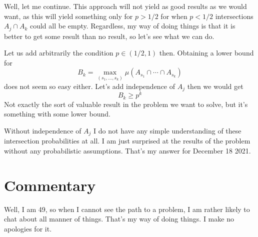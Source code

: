 \documentclass{amsart}
\begin{document}
Well, let me continue.  This approach will not yield as good results as we would want, as this will yield something only for $p>1/2$ for when $p<1/2$ intersections $A_j \cap A_k$ could all be empty.  Regardless, my way of doing things is that it is better to get some result than no result, so let's see what we can do.

Let us add arbitrarily the condition $p\in (1/2,1)$ then.  Obtaining a lower bound for 
\[
B_k = \max_{(s_1,\dots,s_k)} \mu( A_{s_1} \cap \cdots \cap A_{s_k})
\]
does not seem so easy either.  Let's add independence of $A_j$ then we would get
\[
B_k \ge p^k
\]
Not exactly the sort of valuable result in the problem we want to solve, but it's something with some lower bound.  

Without independence of $A_j$ I do not have any simple understanding of these intersection probabilities at all.  I am just surprised at the results of the problem without any probabilistic assumptions.  That's my answer for December 18 2021.





\section{Commentary}

Well, I am 49, so when I cannot see the path to a problem, I am rather likely to chat about all manner of things.  That's my way of doing things. I make no apologies for it.






\begin{thebibliography}{CCCC}
\end{thebibliography}
\end{document}
